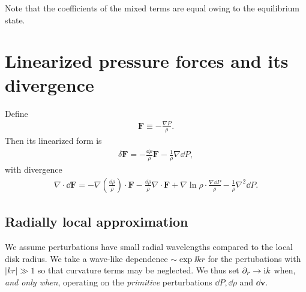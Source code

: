 Note that the coefficients of the mixed terms are equal owing to the
equilibrium state. 


\section{Linearized pressure forces and its divergence}
Define
\begin{align}
  \bm{F} \equiv - \frac{\nabla P}{\rho}. 
\end{align}
Then its linearized form is 
\begin{align}
  \delta \bm{F} = - \frac{\dd\rho}{\rho}\bm{F} -
  \frac{1}{\rho}\nabla\dd P,
\end{align}
with divergence
\begin{align}
  \nabla\cdot\dd\bm{F} = -
  \nabla\left(\frac{\dd\rho}{\rho}\right)\cdot\bm{F} -
  \frac{\dd\rho}{\rho}\nabla\cdot\bm{F} +
  \nabla\ln{\rho}\cdot\frac{\nabla\dd P}{\rho} -
  \frac{1}{\rho}\nabla^2\dd P. 
\end{align}

\subsection{Radially local approximation}
We assume perturbations have small radial wavelengths compared to the
local disk radius. We take a wave-like dependence $\sim \exp{\ii
  k r}$ for the pertubations with $|kr|\gg 1$ so that curvature terms 
may be neglected. We thus set $\partial_r\to \mathrm{i} k$ when, \emph{and only
  when}, operating on the \emph{primitive} perturbations $\dd P,
\dd\rho$ and $\dd\bm{v}$. %

